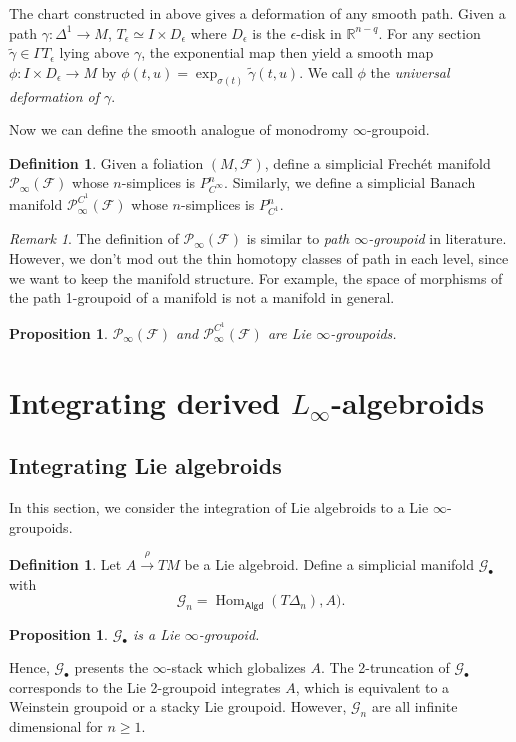\documentclass[12pt]{amsart}
\newtheorem{prop}[thm]{Proposition}
\theoremstyle{definition}
\newtheorem{defn}[thm]{Definition}
\theoremstyle{remark}
\newtheorem{rem}[thm]{Remark}
\numberwithin{equation}{section}
\newcommand{\CG}{{\mathcal G}}
\newcommand{\CF}{{\mathcal F}}
\newcommand{\R}{{\mathbb{R}}}
\newcommand{\1}{{\mathbb{1}}}
\newcommand{\algd}{\mathsf{Algd}}
\newcommand{\Hom}{\operatorname{Hom}}
\begin{document}
The chart constructed in above gives a deformation of any smooth path. Given a path $\gamma: \Delta^1 \to M$, $T_{\epsilon} \simeq I \times D_{\epsilon}$ where $D_{\epsilon}$ is the $\epsilon$-disk in $\R^{n-q}$. For any section $\tilde{\gamma}\in \Gamma T_{\epsilon}$ lying above $\gamma$, the  exponential map then yield a smooth map $\phi: I\times D_{\epsilon} \to M$ by $\phi(t,u) = \exp_{\sigma(t)}\tilde{\gamma}(t, u)$. We call $\phi$ the {\it universal deformation of $\gamma$}.

Now we can define the smooth analogue of monodromy $\infty$-groupoid.
\begin{defn}
	Given a foliation $(M, \CF)$, define a {simplicial Frech{\'e}t manifold} $\mathcal{P}_{\infty}(\CF)$ whose $n$-simplices is $P^n_{C^{\infty}}$. Similarly, we define a simplicial Banach manifold
	$\mathcal{P}_{\infty}^{C^1}(\CF)$ whose $n$-simplices is $P^n_{C^{1}}$.
\end{defn}

\begin{rem}
	The definition of  $\mathcal{P}_{\infty}(\CF)$ is similar to {\it path $\infty$-groupoid} in literature. However, we don't mod out the thin homotopy classes of path in each level, since we want to keep the manifold structure. For example, the space of morphisms of the path 1-groupoid of a manifold is not a manifold in general.
\end{rem}

\begin{prop}
	$\mathcal{P}_{\infty}(\CF)$ and  $\mathcal{P}_{\infty}^{C^1}(\CF)$ are Lie $\infty$-groupoids.
\end{prop}
\section{Integrating derived $L_{\infty}$-algebroids}

\subsection{Integrating Lie algebroids}
In this section, we consider the integration of Lie algebroids to a Lie $\infty$-groupoids.

\begin{defn}
    Let $A\stackrel{\rho}{\to} TM$ be a Lie algebroid. Define a simplicial manifold $\CG_{\bullet}$ with
    $$
    \CG_n = \Hom_{\algd} (T\Delta_n), A).
    $$
\end{defn}

\begin{prop}
$\mathcal{G}_{\bullet} $ is a Lie $\infty$-groupoid.
\end{prop}
Hence, $\CG_{\bullet}$ presents the $\infty$-stack which globalizes $A$. The 2-truncation of $\CG_{\bullet}$ corresponds to the Lie 2-groupoid integrates $A$, which is equivalent to a Weinstein groupoid or a stacky Lie groupoid.  However, $\CG_n$ are all infinite dimensional for $n \ge 1$.
\end{document}
